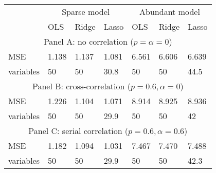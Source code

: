 \documentclass[convert]{standalone}
\begin{document}
\renewcommand{\arraystretch}{1.5}
\begin{tabular}{lllllll}
\cline{2-7}
& \multicolumn{3}{c}{Sparse model} & \multicolumn{3}{c}{Abundant model} \\
\cline{2-7}
& OLS & Ridge & Lasso & OLS & Ridge & Lasso \\ 
\hline 
\multicolumn{7}{c}{Panel A: no correlation ($p=\alpha=0$)}\\
MSE & 1.138 & 1.137 & 1.081 & 6.561 & 6.606 & 6.639 \\ 
variables & 50 & 50 & 30.8 & 50 & 50 & 44.5 \\ 
\multicolumn{7}{c}{Panel B: cross-correlation ($p=0.6, \alpha=0$)}\\
MSE & 1.226 & 1.104 & 1.071 & 8.914 & 8.925 & 8.936 \\ 
variables & 50 & 50 & 29.9 & 50 & 50 & 42 \\ 
\multicolumn{7}{c}{Panel C: serial correlation ($p=0.6, \alpha=0.6$)}\\
MSE & 1.182 & 1.094 & 1.031 & 7.467 & 7.470 & 7.488  \\ 
variables & 50 & 50 & 29.9 & 50 & 50 & 42.3 \\
\hline
\end{tabular}
\end{document}
